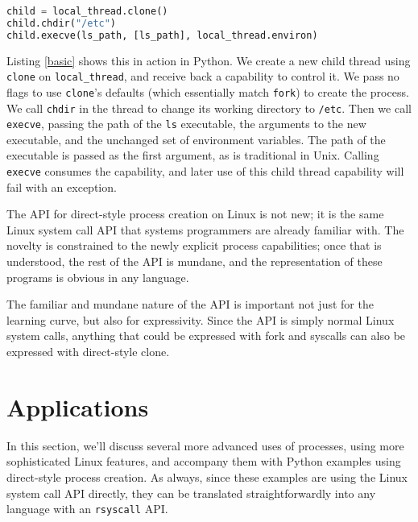 \documentclass{acmart}
\begin{document}
\begin{lstlisting}[float,language=Python,label={basic},caption={Creating a new process, changing CWD, and execing}]
child = local_thread.clone()
child.chdir("/etc")
child.execve(ls_path, [ls_path], local_thread.environ)
\end{lstlisting}

Listing \ref{basic} shows this in action in Python.
We create a new child thread using \texttt{clone} on \texttt{local_thread},
and receive back a capability to control it.
We pass no flags to use \texttt{clone}'s defaults
(which essentially match \texttt{fork}) to create the process.
We call \texttt{chdir} in the thread to change its working directory to \texttt{/etc}.
Then we call \texttt{execve},
passing the path of the \texttt{ls} executable,
the arguments to the new executable,
and the unchanged set of environment variables.
The path of the executable is passed as the first argument,
as is traditional in Unix.
Calling \texttt{execve} consumes the capability,
and later use of this child thread capability will fail with an exception.

The API for direct-style process creation on Linux is not new;
it is the same Linux system call API that systems programmers are already familiar with.
The novelty is constrained to the newly explicit process capabilities;
once that is understood, the rest of the API is mundane,
and the representation of these programs is obvious in any language.

The familiar and mundane nature of the API is important not just for the learning curve,
but also for expressivity.
Since the API is simply normal Linux system calls,
anything that could be expressed with fork and syscalls
can also be expressed with direct-style clone.
\section{Applications}
In this section,
we'll discuss several more advanced uses of processes,
using more sophisticated Linux features,
and accompany them with Python examples using direct-style process creation.
As always, since these examples are using the Linux system call API directly,
they can be translated straightforwardly into any language with an \texttt{rsyscall} API.
\end{document}
